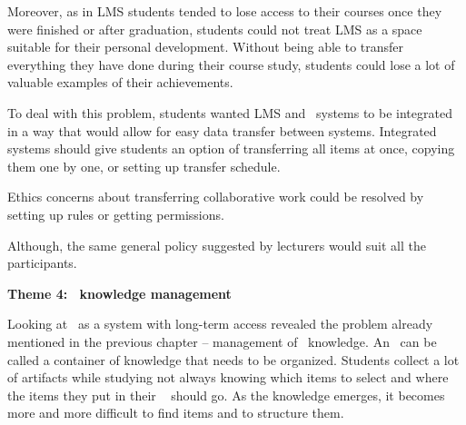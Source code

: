 
Moreover, as in LMS students tended to lose access to their courses once they
were finished or after graduation, students could not treat LMS as a space
suitable for their personal development. Without being able to transfer
everything they have done during their course study, students could lose a lot
of valuable examples of their achievements.


To deal with this problem, students wanted LMS and \ep~systems to be integrated
in a way that would allow for easy data transfer between systems. Integrated
systems should give students an option of transferring all items at once,
copying them one by one, or setting up transfer schedule.

Ethics concerns about transferring collaborative work could be resolved by
setting up rules or getting permissions.


Although, the same general policy suggested by lecturers would suit all the
participants. 

\textbf{Theme 4: \ep~knowledge management}

Looking at \ep~as a system with long-term access revealed the problem already
mentioned in the previous chapter -- management of \ep~knowledge. An \ep~can be
called a container of knowledge that needs to be organized. Students collect a
lot of artifacts while studying not always knowing which items to select and
where the items they put in their \ep~ should go. As the knowledge emerges, it
becomes more and more difficult to find items and to structure them.


